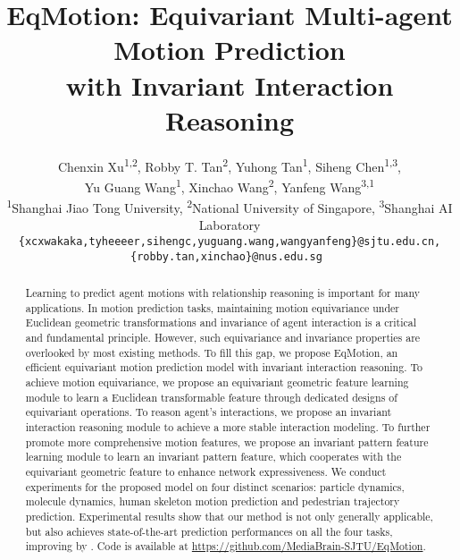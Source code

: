 \documentclass[10pt,twocolumn,letterpaper]{article}
\begin{document}
\title{EqMotion: Equivariant Multi-agent Motion Prediction \\ with Invariant Interaction Reasoning}
\author{Chenxin Xu\textsuperscript{1,2}, Robby T. Tan\textsuperscript{2}, Yuhong Tan\textsuperscript{1}, Siheng Chen\textsuperscript{1,3\footnotemark[1]},  \\ Yu Guang Wang\textsuperscript{1}, Xinchao Wang\textsuperscript{2}, Yanfeng Wang\textsuperscript{3,1}
\\\textsuperscript{1}Shanghai Jiao Tong University,  
\textsuperscript{2}National University of Singapore,
\textsuperscript{3}Shanghai AI Laboratory
\\
{\tt\small {\{xcxwakaka,tyheeeer,sihengc,yuguang.wang,wangyanfeng\}@sjtu.edu.cn},} 
\tt\small {\{robby.tan,xinchao\}@nus.edu.sg}
}

\maketitle

\renewcommand{\thefootnote}{\fnsymbol{footnote}}


\begin{abstract}

Learning to predict agent motions with relationship reasoning is important for many applications.
In motion prediction tasks, maintaining motion equivariance under Euclidean geometric transformations and invariance of agent interaction is a critical and fundamental principle. However, such equivariance and invariance properties are overlooked by most existing methods.
To fill this gap, we propose EqMotion, an efficient equivariant motion prediction model with invariant interaction reasoning. To achieve motion equivariance, we propose an equivariant geometric feature learning module to learn a Euclidean transformable feature through dedicated designs of equivariant operations. To reason agent's interactions, we propose an invariant interaction reasoning module to achieve a more stable interaction modeling. To further promote more comprehensive motion features, we propose an invariant pattern feature learning module to learn an invariant pattern feature, which cooperates with the equivariant geometric feature to enhance network expressiveness. 
We conduct experiments for the proposed model on four distinct scenarios: particle dynamics, molecule dynamics, human skeleton motion prediction and pedestrian trajectory prediction. Experimental results show that our method is not only generally applicable, but also achieves state-of-the-art prediction performances on all the four tasks, improving by . 
Code is available at \url{https://github.com/MediaBrain-SJTU/EqMotion}.
\end{abstract}
\end{document}
